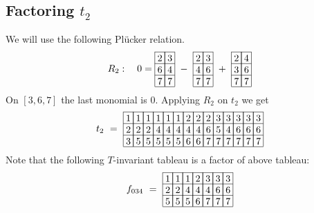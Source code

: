 \subsection{Factoring \(t_2\)}
We will use the following Pl\"{u}cker relation.
\begin{align*}
R_2 :\ \ \ 0 = 
\begin{array}[c]{*{2}c}\cline{1-2}
\lr{2}&\lr{3}\\\cline{1-2}
\lr{6}&\lr{4}\\\cline{1-2}
\lr{7}&\lr{7}\\\cline{1-2}
\end{array}
\ -\ 
\begin{array}[c]{*{2}c}\cline{1-2}
\lr{2}&\lr{3}\\\cline{1-2}
\lr{4}&\lr{6}\\\cline{1-2}
\lr{7}&\lr{7}\\\cline{1-2}
\end{array}
\ +\ 
\begin{array}[c]{*{2}c}\cline{1-2}
\lr{2}&\lr{4}\\\cline{1-2}
\lr{3}&\lr{6}\\\cline{1-2}
\lr{7}&\lr{7}\\\cline{1-2}
\end{array}
\end{align*}
On \([3,6,7]\) the last monomial is \(0\).
Applying \(R_2\) on \(t_2\) we get
\begin{align*}
t_2\ =\ 
\begin{array}[c]{*{14}c}\cline{1-14}
\lr{1}&\lr{1}&\lr{1}&\lr{1}&\lr{1}&\lr{1}&\lr{2}&\lr{2}&\lr{2}&\lr{3}&\lr{3}&\lr{3}&\lr{3}&\lr{3}\\\cline{1-14}
\lr{2}&\lr{2}&\lr{2}&\lr{4}&\lr{4}&\lr{4}&\lr{4}&\lr{4}&\lr{6}&\lr{5}&\lr{4}&\lr{6}&\lr{6}&\lr{6}\\\cline{1-14}
\lr{3}&\lr{5}&\lr{5}&\lr{5}&\lr{5}&\lr{5}&\lr{6}&\lr{6}&\lr{7}&\lr{7}&\lr{7}&\lr{7}&\lr{7}&\lr{7}\\\cline{1-14}
\end{array}
\end{align*}
Note that the following $T$-invariant tableau is a factor of above tableau:
\[
f_{034}\ =\ \begin{array}[c]{*{7}c}\cline{1-7}
\lr{1}&\lr{1}&\lr{1}&\lr{2}&\lr{3}&\lr{3}&\lr{3}\\\cline{1-7}
\lr{2}&\lr{2}&\lr{4}&\lr{4}&\lr{4}&\lr{6}&\lr{6}\\\cline{1-7}
\lr{5}&\lr{5}&\lr{5}&\lr{6}&\lr{7}&\lr{7}&\lr{7}\\\cline{1-7}
\end{array}
\]

